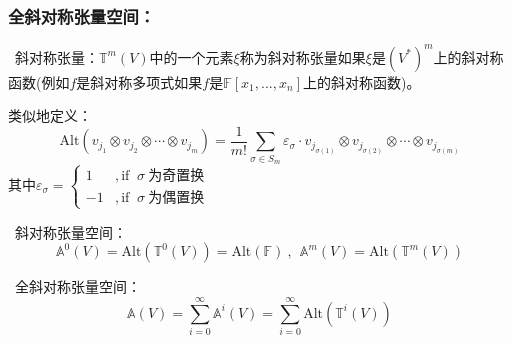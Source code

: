 \documentclass[zihao=-4,UTF8]{report}
\def\F{\mathbb{F}}
\def\T{\mathbb{T}}
\theoremstyle{mystyle} %
\begin{document}
\subsubsection{全斜对称张量空间：}
\par{}\ 斜对称张量：$\T^m(V)$中的一个元素$\xi$称为斜对称张量如果$\xi$是$(V^*)^m$上的斜对称函数(例如$f$是斜对称多项式如果$f$是$\F[x_1,...,x_n]$上的斜对称函数)。
{\par\color{gray}\small
类似地定义：
\begin{equation*}
    \text{Alt}(v_{j_1} \otimes v_{j_2} \otimes\cdots \otimes v_{j_m}) =  \frac{1}{m!}\sum_{\sigma\in S_m}\varepsilon_{\sigma}\cdot v_{j_{\sigma(1)}} \otimes v_{j_{\sigma(2)}} \otimes\cdots \otimes v_{j_{\sigma(m)}}
\end{equation*}   
其中$\varepsilon_{\sigma}=\begin{cases}
    1 &, \text{if }\  \sigma\ \text{为奇置换}\\
    -1 &, \text{if }\  \sigma\ \text{为偶置换}
\end{cases}$
\par}

\par
{}\  斜对称张量空间：
\begin{equation*}
    \mathbb{A}^0(V) = \text{Alt}(\T^0(V)) = \text{Alt}(\F) \ ,\ \ \mathbb{A}^m(V) = \text{Alt}(\T^m(V))
\end{equation*}

\par
{}\  全斜对称张量空间：
\begin{equation*}
    \mathbb{A}(V) = \sum_{i=0}^{\infty} \mathbb{A}^i(V) = \sum_{i=0}^{\infty}\text{Alt}(\T^i(V))
\end{equation*}   \par



\nocite{*}

\thispagestyle{fancy} 
\end{document}
